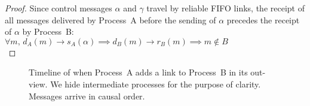\begin{proof}
  Since control messages $\alpha$ and $\gamma$ travel by reliable FIFO links,
  the receipt of all messages delivered by Process~A before the sending of
  $\alpha$ precedes the receipt of $\alpha$ by Process~B:\\
  $\forall m,\, d_A(m) \rightarrow s_A(\alpha) \implies d_B(m) \rightarrow
  r_B(m) \implies m \not\in B$\\
\end{proof}


\begin{figure*}
  \begin{center}
    
    \caption{\label{fig:timeline}Timeline of \RPCBROADCAST when Process~A adds a
      link to Process~B in its out-view. We hide intermediate processes for the
      purpose of clarity. Messages arrive in causal order.}
  \end{center}
\end{figure*}



